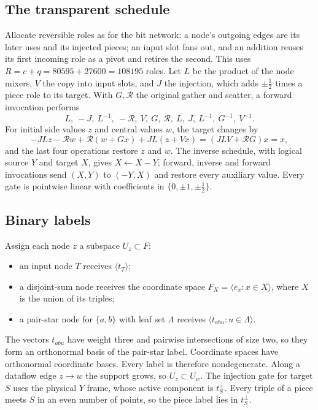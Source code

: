 \subsection{The transparent schedule}
Allocate reversible roles as for the bit network: a node's outgoing edges are
its later uses and its injected pieces; an input slot fans out, and an
addition reuses its first incoming role as a pivot and retires the second.
This uses $R=c+q=80595+27600=108195$ roles. Let $L$ be the product of the
node mixers, $V$ the copy into input slots, and $J$ the injection, which adds
$\pm\frac12$ times a piece role to its target. With $G,\mathcal R$ the
original gather and scatter, a forward invocation performs
\[
 L,\ -J,\ L^{-1},\ -\mathcal R,\ V,\ G,\ \mathcal R,\ L,\ J,\ L^{-1},\
 G^{-1},\ V^{-1}.
\]
For initial side values $z$ and central values $w$, the target changes by
\[
 -JLz-\mathcal Rw+\mathcal R(w+Gx)+JL(z+Vx)=(JLV+\mathcal RG)x=x,
\]
and the last four operations restore $z$ and $w$. The inverse schedule, with
logical source $Y$ and target $X$, gives $X\gets X-Y$; forward, inverse and
forward invocations send $(X,Y)$ to $(-Y,X)$ and restore every auxiliary
value. Every gate is pointwise linear with coefficients in
$\{0,\pm1,\pm\frac12\}$.

\subsection{Binary labels}
Assign each node $z$ a subspace $U_z\subset F$:
\begin{itemize}
\item an input node $T$ receives $\langle t_T\rangle$;
\item a disjoint-sum node receives the coordinate space
 $F_{X}=\langle e_x:x\in X\rangle$, where $X$ is the union of its triples;
\item a pair-star node for $\{a,b\}$ with leaf set $\Lambda$ receives
 $\langle t_{abu}:u\in\Lambda\rangle$.
\end{itemize}
The vectors $t_{abu}$ have weight three and pairwise intersections of size
two, so they form an orthonormal basis of the pair-star label. Coordinate
spaces have orthonormal coordinate bases. Every label is therefore
nondegenerate. Along a dataflow edge $z\to w$ the support grows, so
$U_z\subset U_w$. The injection gate for target $S$ uses the physical $Y$
frame, whose active component is $t_S^\perp$. Every triple of a piece meets
$S$ in an even number of points, so the piece label lies in $t_S^\perp$.

